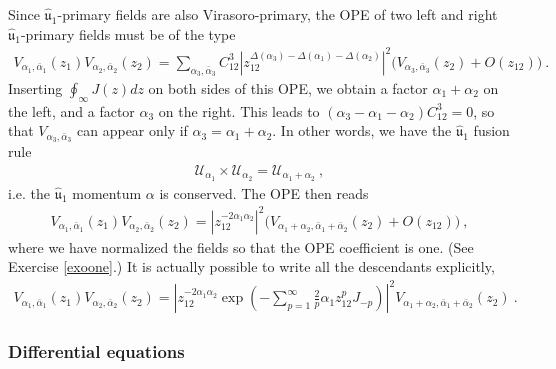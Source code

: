 \documentclass[12pt, a4paper, notitlepage, twoside]{report}
\numberwithin{equation}{section}
\theoremstyle{break}
\begin{document}
Since $\hat{\mathfrak{u}}_1$-primary fields are also Virasoro-primary, the OPE of two left and right 
$\hat{\mathfrak{u}}_1$-primary fields must be of the type 
\begin{align}
 V_{\alpha_1,\bar\alpha_1}(z_1) V_{\alpha_2,\bar\alpha_2}(z_2) = \sum_{\alpha_3,\bar\alpha_3} C_{12}^3 \left| z_{12}^{\Delta(\alpha_3)-\Delta(\alpha_1)-\Delta(\alpha_2)}\right|^2 \Big(V_{\alpha_3,\bar\alpha_3}(z_2) + O(z_{12}) \Big)\ .
\end{align}
Inserting $\oint_\infty J(z)dz$ on both sides of this OPE, we obtain a factor $\alpha_1+\alpha_2$ on the left, and a factor $\alpha_3$ on the right.
This leads to $(\alpha_3-\alpha_1-\alpha_2)C_{12}^3=0$, so that $V_{\alpha_3,\bar\alpha_3}$ can appear only if $\alpha_3=\alpha_1+\alpha_2$. 
In other words, we have the $\hat{\mathfrak{u}}_1$ fusion rule
\begin{align}
 \boxed{\mathcal{U}_{\alpha_1}\times \mathcal{U}_{\alpha_2} = \mathcal{U}_{\alpha_1+\alpha_2}}\ ,
\label{vvp}
\end{align}
i.e. the $\hat{\mathfrak{u}}_1$ momentum $\alpha$ is conserved.
The OPE then reads 
\begin{align}
\boxed{V_{\alpha_1,\bar\alpha_1}(z_1)V_{\alpha_2,\bar\alpha_2}(z_2) 
= 
\left| z_{12}^{-2\alpha_1\alpha_2}\right|^2 \big( V_{\alpha_1+\alpha_2,\bar\alpha_1+\bar\alpha_2}(z_2) + O(z_{12})\big)}\ ,
\label{vvoo}
\end{align}
where we have normalized the fields so that the OPE coefficient is one. (See Exercise \ref{exoone}.)
It is actually possible to write all the descendants explicitly,
\begin{align}
 V_{\alpha_1,\bar\alpha_1}(z_1)V_{\alpha_2,\bar\alpha_2}(z_2) 
= 
\left| z_{12}^{-2\alpha_1\alpha_2} \exp\left(-\sum_{p=1}^\infty \frac{2}{p}\alpha_1 z_{12}^pJ_{-p} \right)\right|^2 V_{\alpha_1+\alpha_2,\bar\alpha_1+\bar\alpha_2}(z_2) \ .
\end{align}

\subsubsection{Differential equations}
\end{document}
